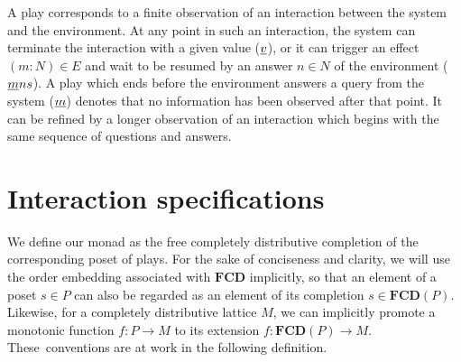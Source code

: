 \documentclass[11pt,oneside,draft]{book}
\theoremstyle{definition}
\newcommand{\ul}[1]{%
  \underline{\smash{#1}}
}
\begin{document}
A play corresponds to a finite observation of
an interaction between the system and the environment.
At any point in such an interaction,
the system can terminate the interaction with a given value ($\ul{v}$),
or it can trigger an effect $(m \mathbin: N) \in E$ and
wait to be resumed by
an answer $n \in N$ of the environment
($\ul{m} n s$).
%
A play which ends before
the environment answers a query from the system ($\ul{m}$)
denotes that no information has been observed after that point.
It can be refined by a longer observation
of an interaction which begins with the same sequence of
questions and answers.

%
%


\section{Interaction specifications} %

We define our monad as the free completely distributive completion
of the corresponding poset of plays.
For the sake of conciseness and clarity,
we will use the order embedding associated with $\mathbf{FCD}$
implicitly,
so that an element of a poset $s \in P$
can also be regarded as an element of
its completion $s \in \mathbf{FCD}(P)$.
Likewise,
for a completely distributive lattice $M$,
we can implicitly
promote a monotonic function
$f : P \rightarrow M$
to its extension
$f : \mathbf{FCD}(P) \rightarrow M$.
These~conventions are at work
in the following definition.
\end{document}
